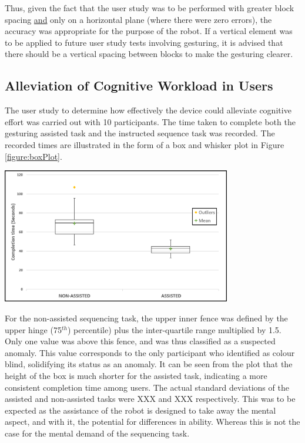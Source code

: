 \documentclass[11pt]{article}
\begin{document}
Thus, given the fact that the user study was to be performed with greater block spacing \underline{and} only on a horizontal plane (where there were zero errors), the accuracy was appropriate for the purpose of the robot. If a vertical element was to be applied to future user study tests involving gesturing, it is advised that there should be a vertical spacing between blocks to make the gesturing clearer.

\subsection{Alleviation of Cognitive Workload in Users}

The user study to determine how effectively the device could alleviate cognitive effort was carried out with 10 participants. The time taken to complete both the gesturing assisted task and the instructed sequence task was recorded. The recorded times are illustrated in the form of a box and whisker plot in Figure \ref{figure:boxPlot}.

\begin{center}
\includegraphics[width=0.75\textwidth]{images/boxPlot.png}
\label{figure:boxPlot}
\end{center}

For the non-assisted sequencing task, the upper inner fence was defined by the upper hinge (75$^{th}$) percentile) plus the inter-quartile range multiplied by 1.5. Only one value was above this fence, and was thus classified as a suspected anomaly. This value corresponds to the only participant who identified as colour blind, solidifying its status as an anomaly. It can be seen from the plot that the height of the box is much shorter for the assisted task, indicating a more consistent completion time among users. The actual standard deviations of the assisted and non-assisted tasks were XXX and XXX respectively. This was to be expected as the assistance of the robot is designed to take away the mental aspect, and with it, the potential for differences in ability. Whereas this is not the case for the mental demand of the sequencing task. 
\end{document}
